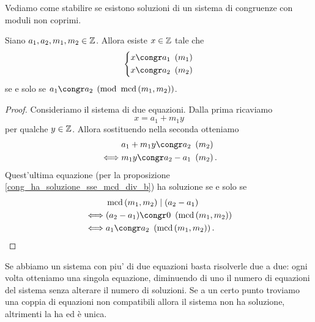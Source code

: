 Vediamo come stabilire se esistono soluzioni di un sistema di congruenze con moduli non coprimi.

\begin{proposition}
    Siano $a_1, a_2, m_1, m_2 \in \mathbb{Z}$. Allora esiste $x \in \mathbb{Z}$ tale che 
    \begin{equation*}
        \left\{
        \begin{alignedat}{1}
            x&\congr a_1 \Mod{m_1}\\
            x&\congr a_2 \Mod{m_2}
        \end{alignedat}      
        \right . 
    \end{equation*}
    se e solo se $a_1 \congr a_2 \pmod{\mcd{m_1}{m_2}}$.
\end{proposition}
\begin{proof}
    Consideriamo il sistema di due equazioni. Dalla prima ricaviamo \[
        x = a_1 + m_1y    
    \] per qualche $y \in \mathbb{Z}$. Allora sostituendo nella seconda otteniamo \begin{alignat*}
        {1}
        &a_1+m_1y \congr a_2 \Mod{m_2}\\
        \iff &m_1y \congr a_2 - a_1 \Mod{m_2}.
    \end{alignat*}
    Quest'ultima equazione (per la proposizione \ref{cong_ha_soluzione_sse_mcd_div_b}) ha soluzione se e solo se 
    \begin{alignat*}
        {1}
        &\mcd{m_1}{m_2} \divides (a_2-a_1) \\
        \iff &(a_2-a_1) \congr 0 \Mod{\mcd{m_1}{m_2}} \\
        \iff &a_1 \congr a_2 \Mod{\mcd{m_1}{m_2}}. \tag*{\qedhere}
    \end{alignat*}
\end{proof}

Se abbiamo un sistema con piu' di due equazioni basta risolverle due a due: ogni volta otteniamo una singola equazione, diminuendo di uno il numero di equazioni del sistema senza alterare il numero di soluzioni. Se a un certo punto troviamo una coppia di equazioni non compatibili allora il sistema non ha soluzione, altrimenti la ha ed è unica.

